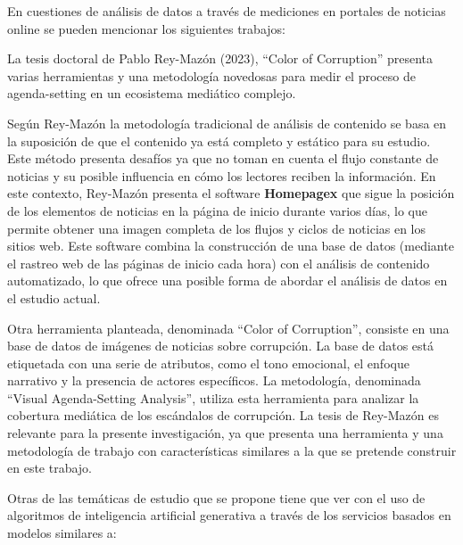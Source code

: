 \documentclass[12pt]{article}
\begin{document}

En cuestiones de análisis de datos a través de mediciones en portales de noticias online se pueden mencionar los siguientes trabajos:

La tesis doctoral de Pablo Rey-Mazón (2023), ``Color of Corruption'' \cite{mazon:2023} presenta varias herramientas y una metodología novedosas para medir el proceso de agenda-setting en un ecosistema mediático complejo.

Según Rey-Mazón la metodología tradicional de análisis de contenido se basa en la suposición de que el contenido ya está completo y estático para su estudio. Este método presenta desafíos ya que no toman en cuenta el flujo constante de noticias y su posible influencia en cómo los lectores reciben la información. En este contexto, Rey-Mazón presenta el software \textbf{Homepagex} que sigue la posición de los elementos de noticias en la página de inicio durante varios días, lo que permite obtener una imagen completa de los flujos y ciclos de noticias en los sitios web. Este software combina la construcción de una base de datos (mediante el rastreo web de las páginas de inicio cada hora) con el análisis de contenido automatizado, lo que ofrece una posible forma de abordar el análisis de datos en el estudio actual.

Otra herramienta planteada, denominada ``Color of Corruption'', consiste en una base de datos de imágenes de noticias sobre corrupción. La base de datos está etiquetada con una serie de atributos, como el tono emocional, el enfoque narrativo y la presencia de actores específicos. La metodología, denominada ``Visual Agenda-Setting Analysis'', utiliza esta herramienta para analizar la cobertura mediática de los escándalos de corrupción. La tesis de Rey-Mazón es relevante para la presente investigación, ya que presenta una herramienta y una metodología de trabajo con características similares a la que se pretende construir en este trabajo. 



Otras de las temáticas de estudio que se propone tiene que ver con el uso de algoritmos de inteligencia artificial generativa a través de los servicios basados en modelos similares a:  
\end{document}
